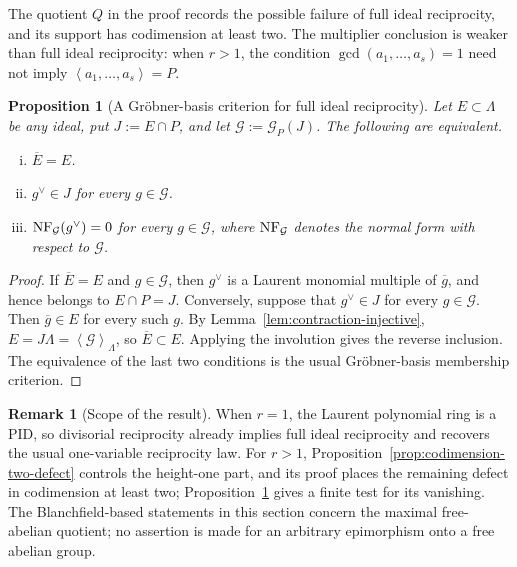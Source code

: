 \documentclass{article}
\theoremstyle{definition}
\newtheorem{remark}[definition]{Remark}
\theoremstyle{plain}
\newtheorem{proposition}[definition]{Proposition}
\newcommand{\NF}{{\rm NF}}
\DeclareMathOperator{\gcdop}{gcd}
\newcommand{\ideal}[1]{\left\langle #1 \right\rangle}
\begin{document}
The quotient \(Q\) in the proof records the possible failure of full ideal
reciprocity, and its support has codimension at least two.  The multiplier
conclusion is weaker than full ideal reciprocity: when \(r>1\), the
condition \(\gcdop(a_1,\dots,a_s)=1\) need not imply
\(\ideal{a_1,\dots,a_s}=P\).

\begin{proposition}[A Gr\"obner-basis criterion for full ideal reciprocity]
\label{prop:groebner-full-reciprocity}
Let \(E\subset\Lambda\) be any ideal, put \(J:=E\cap P\), and let
\(\mathcal G:=\mathcal G_P(J)\).  The following are equivalent.
\begin{enumerate}[(i)]
\item \(\overline E=E\).
\item \(g^\vee\in J\) for every \(g\in\mathcal G\).
\item \(\NF_{\mathcal G}(g^\vee)=0\) for every \(g\in\mathcal G\), where
\(\NF_{\mathcal G}\) denotes the normal form with respect to
\(\mathcal G\).
\end{enumerate}
\end{proposition}

\begin{proof}
If \(\overline E=E\) and \(g\in\mathcal G\), then \(g^\vee\) is a Laurent
monomial multiple of \(\overline g\), and hence belongs to \(E\cap P=J\).
Conversely, suppose that \(g^\vee\in J\) for every \(g\in\mathcal G\).
Then \(\overline g\in E\) for every such \(g\).  By
Lemma~\ref{lem:contraction-injective},
\(E=J\Lambda=\ideal{\mathcal G}_{\Lambda}\), so
\(\overline E\subset E\).  Applying the involution gives the reverse
inclusion.  The equivalence of the last two conditions is the usual
Gr\"obner-basis membership criterion.
\end{proof}

\begin{remark}[Scope of the result]\label{rem:scope-of-reciprocity}
When \(r=1\), the Laurent polynomial ring is a PID, so divisorial
reciprocity already implies full ideal reciprocity and recovers the usual
one-variable reciprocity law.  For \(r>1\),
Proposition~\ref{prop:codimension-two-defect} controls the height-one part,
and its proof places the remaining defect in codimension at least two;
Proposition~\ref{prop:groebner-full-reciprocity} gives a finite test for
its vanishing.  The Blanchfield-based statements in this section concern
the maximal free-abelian quotient; no assertion is made for an arbitrary
epimorphism onto a free abelian group.
\end{remark}
\end{document}
